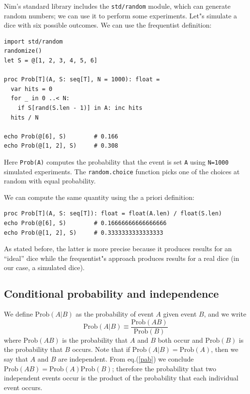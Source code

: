 \documentclass[justified, sixbynine]{tufte-book}
\def\ft{\small\tt}
\theoremstyle{plain}%
\newtheorem * {corollary}{Corollary}
\theoremstyle{definition}
\theoremstyle{remark}
\newtheorem * {remark}{Remark}
\newtheorem * {note}{Note}
\begin{document}
\begin{fullwidth}
Nim's standard library includes the {\ft std/random} module, which can generate random numbers; we can use it to perform some experiments.
Let"s simulate a dice with six possible outcomes.
We can use the frequentist definition:

\begin{lstlisting}
import std/random
randomize()
let S = @[1, 2, 3, 4, 5, 6]

proc Prob[T](A, S: seq[T], N = 1000): float =
  var hits = 0
  for _ in 0 ..< N:
    if S[rand(S.len - 1)] in A: inc hits
  hits / N

echo Prob(@[6], S)        # 0.166
echo Prob(@[1, 2], S)     # 0.308
\end{lstlisting}
Here {\ft \textrm{Prob}(A)} computes the probability that the event is set {\ft A} using {\ft N=1000} simulated experiments.
The {\ft random.choice} function picks one of the choices at random with equal probability.

We can compute the same quantity using the a priori definition:

\begin{lstlisting}
proc Prob[T](A, S: seq[T]): float = float(A.len) / float(S.len)
echo Prob(@[6], S)        # 0.16666666666666666
echo Prob(@[1, 2], S)     # 0.3333333333333333
\end{lstlisting}

As stated before, the latter is more precise because it produces results for an ``ideal'' dice while the frequentist"s approach produces results for a real dice (in our case, a simulated dice).

\goodbreak\subsection{Conditional probability and independence}

We define $\textrm{Prob}(A|B)$ as the probability of event $A$ given event $B$, and we
write
\begin{equation}
\textrm{Prob}(A|B)\equiv \frac{\textrm{Prob}(AB)}{\textrm{Prob}(B)}  \label{pab}
\end{equation}
where $\textrm{Prob}(AB)$ is the probability that $A$ and $B$ both occur and $\textrm{Prob}(B)$ is
the probability that $B$ occurs. Note that if $\textrm{Prob}(A|B)=\textrm{Prob}(A)$, then we say
that $A$ and $B$ are independent. From eq.(\ref{pab})
we conclude $\textrm{Prob}(AB)=\textrm{Prob}(A)\textrm{Prob}(B)$; therefore the probability that two
independent events occur is the product of the probability that each individual event
occurs.


\end{fullwidth}
\end{document}
